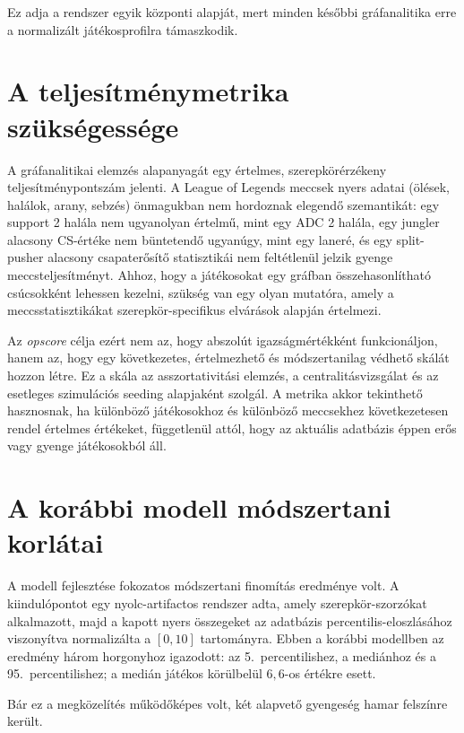 Ez adja a rendszer egyik központi alapját, mert minden későbbi gráfanalitika erre a normalizált játékosprofilra támaszkodik.

\section{A teljesítménymetrika szükségessége}

A gráfanalitikai elemzés alapanyagát egy értelmes, szerepkörérzékeny teljesítménypontszám jelenti. A League of Legends meccsek nyers adatai (ölések, halálok, arany, sebzés) önmagukban nem hordoznak elegendő szemantikát: egy support 2 halála nem ugyanolyan értelmű, mint egy ADC 2 halála, egy jungler alacsony CS-értéke nem büntetendő ugyanúgy, mint egy laneré, és egy split-pusher alacsony csapaterősítő statisztikái nem feltétlenül jelzik gyenge meccsteljesítményt. Ahhoz, hogy a játékosokat egy gráfban összehasonlítható csúcsokként lehessen kezelni, szükség van egy olyan mutatóra, amely a meccsstatisztikákat szerepkör-specifikus elvárások alapján értelmezi.

Az \textit{opscore} célja ezért nem az, hogy abszolút igazságmértékként funkcionáljon, hanem az, hogy egy következetes, értelmezhető és módszertanilag védhető skálát hozzon létre. Ez a skála az asszortativitási elemzés, a centralitásvizsgálat és az esetleges szimulációs seeding alapjaként szolgál. A metrika akkor tekinthető hasznosnak, ha különböző játékosokhoz és különböző meccsekhez következetesen rendel értelmes értékeket, függetlenül attól, hogy az aktuális adatbázis éppen erős vagy gyenge játékosokból áll.

\section{A korábbi modell módszertani korlátai}

A modell fejlesztése fokozatos módszertani finomítás eredménye volt. A kiindulópontot egy nyolc-artifactos rendszer adta, amely szerepkör-szorzókat alkalmazott, majd a kapott nyers összegeket az adatbázis percentilis-eloszlásához viszonyítva normalizálta a $[0,10]$ tartományra. Ebben a korábbi modellben az eredmény három horgonyhoz igazodott: az 5.~percentilishez, a mediánhoz és a 95.~percentilishez; a medián játékos körülbelül $6{,}6$-os értékre esett.

Bár ez a megközelítés működőképes volt, két alapvető gyengeség hamar felszínre került.

